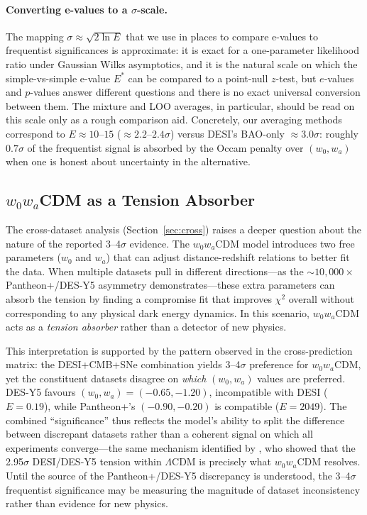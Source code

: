 \documentclass[11pt,a4paper]{article}
\newcommand{\LCDM}{$\Lambda$CDM}
\begin{document}
\paragraph{Converting e-values to a $\sigma$-scale.} The mapping $\sigma \approx \sqrt{2\ln E}$ that we use in places to compare e-values to frequentist significances is approximate: it is exact for a one-parameter likelihood ratio under Gaussian Wilks asymptotics, and it is the natural scale on which the simple-vs-simple e-value $E^{*}$ can be compared to a point-null $z$-test, but $e$-values and $p$-values answer different questions and there is no exact universal conversion between them. The mixture and LOO averages, in particular, should be read on this scale only as a rough comparison aid. Concretely, our averaging methods correspond to $E \approx 10$--$15$ ($\approx 2.2$--$2.4\sigma$) versus DESI's BAO-only $\approx 3.0\sigma$: roughly $0.7\sigma$ of the frequentist signal is absorbed by the Occam penalty over $(w_0, w_a)$ when one is honest about uncertainty in the alternative.

\subsection{$w_0w_a$CDM as a Tension Absorber}

The cross-dataset analysis (Section~\ref{sec:cross}) raises a deeper question about the nature of the reported 3--4$\sigma$ evidence. The $w_0w_a$CDM model introduces two free parameters ($w_0$ and $w_a$) that can adjust distance-redshift relations to better fit the data. When multiple datasets pull in different directions---as the ${\sim}10{,}000\times$ Pantheon+/DES-Y5 asymmetry demonstrates---these extra parameters can absorb the tension by finding a compromise fit that improves $\chi^2$ overall without corresponding to any physical dark energy dynamics. In this scenario, $w_0w_a$CDM acts as a \textit{tension absorber} rather than a detector of new physics.

This interpretation is supported by the pattern observed in the cross-prediction matrix: the DESI+CMB+SNe combination yields 3--4$\sigma$ preference for $w_0w_a$CDM, yet the constituent datasets disagree on \textit{which} $(w_0, w_a)$ values are preferred. DES-Y5 favours $(w_0, w_a) = (-0.65, -1.20)$, incompatible with DESI ($E = 0.19$), while Pantheon+'s $(-0.90, -0.20)$ is compatible ($E = 2049$). The combined ``significance'' thus reflects the model's ability to split the difference between discrepant datasets rather than a coherent signal on which all experiments converge---the same mechanism identified by \citet{OngBayesian2025}, who showed that the 2.95$\sigma$ DESI/DES-Y5 tension within \LCDM{} is precisely what $w_0w_a$CDM resolves. Until the source of the Pantheon+/DES-Y5 discrepancy is understood, the 3--4$\sigma$ frequentist significance may be measuring the magnitude of dataset inconsistency rather than evidence for new physics.
\end{document}

